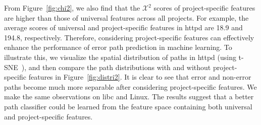 \documentclass[12pt]{report}	%
\begin{document}
From Figure~\ref{fig:chi2}, we also find that the $\mathcal{X}^2$ scores of project-specific features
are higher than those of universal features across all projects.
For example, the average scores of universal and project-specific features in httpd are 18.9 and 194.8, respectively.
%
Therefore, considering project-specific features can effectively enhance 
the performance of error path prediction in machine learning.
To illustrate this, we visualize the spatial distribution of paths in httpd (using t-SNE~\cite{maaten2008visualizing}),
and then compare the path distributions with and without project-specific features in Figure~\ref{fig:distri2}.
It is clear to see that error and non-error paths become much more separable after considering project-specific features.
We make the same observations on libc and Linux.
The results suggest that a better path classifier could be learned from the feature space 
containing both universal and project-specific features.
\end{document}

